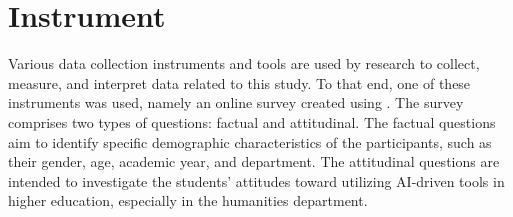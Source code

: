 \begin{Center}
	\begin{figure}
		\centering
	\end{figure}

	\begin{figure}
		\centering
	\end{figure}
\end{Center}
\begin{Center}
	\begin{figure}
		\centering
	\end{figure}

	\begin{figure}
		\centering
	\end{figure}
\end{Center}
\section{Instrument}
\justifying

Various data collection instruments and tools are used by research to collect,
measure, and interpret data related to this study. To that end, one of these
instruments was used, namely an online survey created using
. The survey comprises two types of questions: factual and attitudinal. The factual questions aim to
identify specific demographic characteristics of the participants, such as
their gender, age, academic year, and department. The attitudinal questions
are intended to investigate the students’ attitudes toward utilizing AI-driven
tools in higher education, especially in the humanities department.


